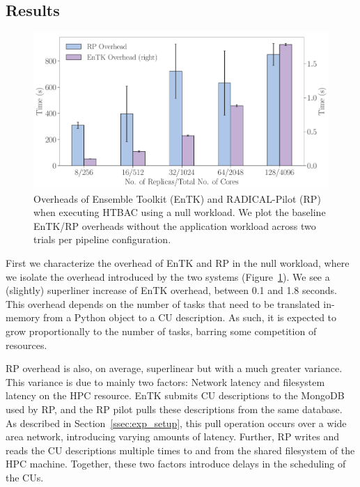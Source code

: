\subsection{Results}\label{ssec:exp_results}


\begin{figure}
  \centering
  \includegraphics[width=\columnwidth]{null_workload_overheads.pdf}
  \caption{Overheads of Ensemble Toolkit (EnTK) and RADICAL-Pilot (RP) when
           executing HTBAC using a null workload. We plot the baseline
           EnTK/RP overheads without the application workload across two
           trials per pipeline configuration.}\label{fig:exp1}
\end{figure}

First we characterize the overhead of EnTK and RP in the null workload, where
we isolate the overhead introduced by the two systems
(Figure~\ref{fig:exp1}). We see a (slightly) superliner increase of EnTK
overhead, between 0.1 and 1.8 seconds. This overhead depends on the number of
tasks that need to be translated in-memory from a Python object to a CU 
description. As such, it is expected to grow proportionally to the
number of tasks, barring some competition of resources.

RP overhead is also, on average, superlinear but with a much greater
variance. This variance is due to mainly two factors: Network latency and
filesystem latency on the HPC resource. EnTK submits CU descriptions to the
MongoDB used by RP, and the RP pilot pulls these descriptions from the same
database. As described in Section~\ref{ssec:exp_setup}, this pull operation
occurs over a wide area network, introducing varying amounts of latency.
Further, RP writes and reads the CU descriptions multiple times to and
from the shared filesystem of the HPC machine. Together, these two factors
introduce delays in the scheduling of the CUs.


